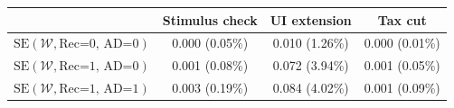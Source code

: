 \begin{tabular}{@{}lccc@{}}
\toprule
                          & Stimulus check      & UI extension    & Tax cut    \\  \midrule
$\mathrm{SE}(\mathcal{W}, \text{Rec=0, AD=0})$ & 0.000 (0.05\%)  & 0.010 (1.26\%)  & 0.000 (0.01\%)     \\
$\mathrm{SE}(\mathcal{W}, \text{Rec=1, AD=0})$ & 0.001 (0.08\%)  & 0.072 (3.94\%)  & 0.001 (0.05\%)     \\
$\mathrm{SE}(\mathcal{W}, \text{Rec=1, AD=1})$ & 0.003 (0.19\%)  & 0.084 (4.02\%)  & 0.001 (0.09\%)     \\ \bottomrule
\end{tabular}

